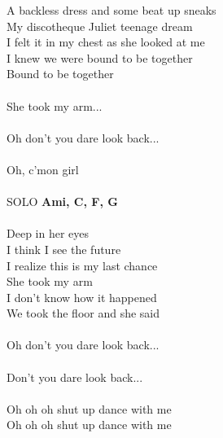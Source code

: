 \begin{multicols}{2}
A backless dress and some beat up sneaks\\
My discotheque Juliet teenage dream\\
I felt it in my chest as she looked at me\\
I knew we were bound to be together\\
Bound to be together\\
\\
She took my arm...\\
\\
Oh don't you dare look back...\\
\\
Oh, c'mon girl\\
\\
SOLO \footnotesize\textbf{Ami, C, F, G}\\
\normalsize
\\
Deep in her eyes\\
I think I see the future\\
I realize this is my last chance\\
She took my arm\\
I don't know how it happened\\
We took the floor and she said\\
\\
Oh don't you dare look back...\\
\\
Don't you dare look back...\\
\\
Oh oh oh shut up dance with me\\
Oh oh oh shut up dance with me
\end{multicols}